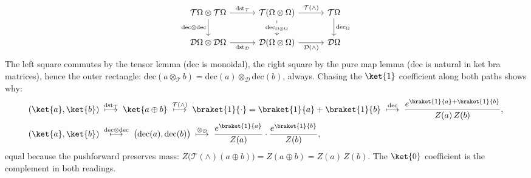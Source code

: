 \documentclass[anon]{../../journal-templates/NeSy26/nesy2026} %
\begin{document}
\[\begin{tikzcd}[ampersand replacement=\&, column sep=3.0em]
  {\mathcal T\Omega \otimes \mathcal T\Omega} \& {\mathcal T(\Omega \otimes \Omega)} \& {\mathcal T\Omega} \\
  {\mathcal D\Omega \otimes \mathcal D\Omega} \& {\mathcal D(\Omega \otimes \Omega)} \& {\mathcal D\Omega}
  \arrow["{\mathrm{dst}_{\mathcal T}}", from=1-1, to=1-2]
  \arrow["{\mathcal T(\wedge)}", from=1-2, to=1-3]
  \arrow["{\mathrm{dec} \otimes \mathrm{dec}}"', from=1-1, to=2-1]
  \arrow["{\mathrm{dec}_{\Omega \otimes \Omega}}"{description}, from=1-2, to=2-2]
  \arrow["{\mathrm{dec}_\Omega}", from=1-3, to=2-3]
  \arrow["{\mathrm{dst}_{\mathcal D}}"', from=2-1, to=2-2]
  \arrow["{\mathcal D(\wedge)}"', from=2-2, to=2-3]
\end{tikzcd}\]
The left square commutes by the tensor lemma ($\mathrm{dec}$ is
monoidal), the right square by the pure map lemma ($\mathrm{dec}$ is
natural in ket bra matrices), hence the outer rectangle:
$\mathrm{dec}(a \otimes_{\mathcal T} b) =
 \mathrm{dec}(a) \otimes_{\mathcal D} \mathrm{dec}(b)$, always. Chasing
the $\ket{1}$ coefficient along both paths shows why:
\begin{align*}
  (\ket{a}, \ket{b})
  \;&\stackrel{\mathrm{dst}_{\mathcal T}}{\longmapsto}\; \ket{a \oplus b}
  \;\stackrel{\mathcal T(\wedge)}{\longmapsto}\;
    \braket{1}{{\cdot}} = \braket{1}{a} + \braket{1}{b}
  \;\stackrel{\mathrm{dec}}{\longmapsto}\;
    \frac{e^{\braket{1}{a} + \braket{1}{b}}}{Z(a)\,Z(b)},\\
  (\ket{a}, \ket{b})
  \;&\stackrel{\mathrm{dec} \otimes \mathrm{dec}}{\longmapsto}\;
    \bigl(\mathrm{dec}(a), \mathrm{dec}(b)\bigr)
  \;\stackrel{\otimes_{\mathcal D}}{\longmapsto}\;
    \frac{e^{\braket{1}{a}}}{Z(a)} \cdot
    \frac{e^{\braket{1}{b}}}{Z(b)},
\end{align*}
equal because the pushforward preserves mass:
$Z\bigl(\mathcal T(\wedge)(a \oplus b)\bigr) = Z(a \oplus b) =
Z(a)\,Z(b)$. The $\ket{0}$ coefficient is the complement in both
readings.
\end{document}
